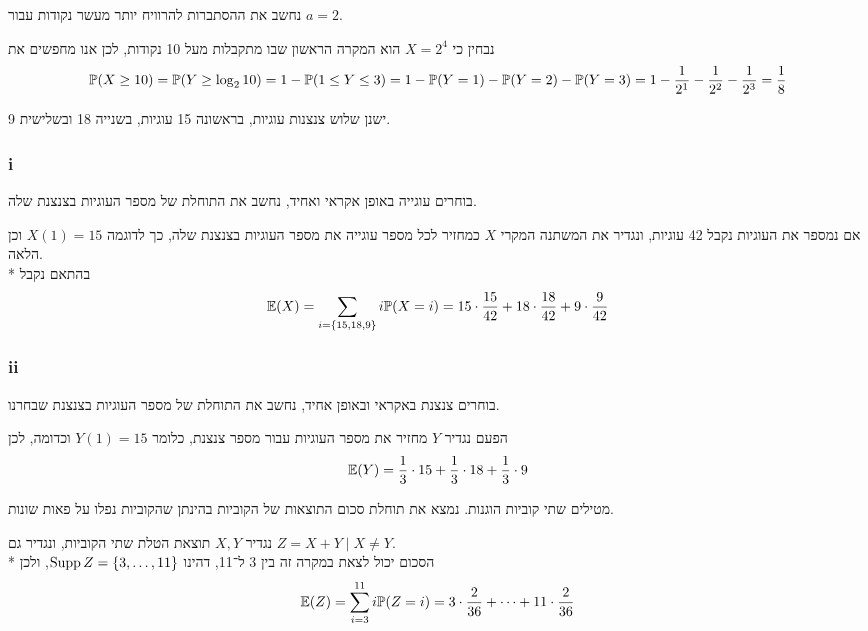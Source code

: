 \subquestion{}
נחשב את ההסתברות להרוויח יותר מעשר נקודות עבור $a = 2$.
\begin{solution}
	נבחין כי $X = 2^4$ הוא המקרה הראשון שבו מתקבלות מעל 10 נקודות, לכן אנו מחפשים את
	\[
		\mathbb{P}(X \ge 10) = \mathbb{P}(Y \ge \log_2 10) = 1 - \mathbb{P}(1 \le Y \le 3) = 1 - \mathbb{P}(Y = 1) - \mathbb{P}(Y = 2) - \mathbb{P}(Y = 3) = 1 - \frac{1}{2^1} - \frac{1}{2^2} - \frac{1}{2^3} = \frac{1}{8}
	\]
\end{solution}

\question{}
\subquestion{}
ישנן שלוש צנצנות עוגיות, בראשונה 15 עוגיות, בשנייה 18 ובשלישית 9.

\subsubsection{i}
בוחרים עוגייה באופן אקראי ואחיד, נחשב את התוחלת של מספר העוגיות בצנצנת שלה.
\begin{solution}
	אם נמספר את העוגיות נקבל 42 עוגיות, ונגדיר את המשתנה המקרי $X$ כמחזיר לכל מספר עוגייה את מספר העוגיות בצנצנת שלה, כך לדוגמה $X(1) = 15$ וכן הלאה. \\*
	בהתאם נקבל
	\[
		\mathbb{E}(X)
		= \sum_{i = \{15, 18, 9\}} i \mathbb{P}(X = i)
		= 15 \cdot \frac{15}{42} + 18 \cdot \frac{18}{42} + 9 \cdot \frac{9}{42}
	\]
\end{solution}

\subsubsection{ii}
בוחרים צנצנת באקראי ובאופן אחיד, נחשב את התוחלת של מספר העוגיות בצנצנת שבחרנו.
\begin{solution}
	הפעם נגדיר $Y$ מחזיר את מספר העוגיות עבור מספר צנצנת, כלומר $Y(1) = 15$ וכדומה, לכן
	\[
		\mathbb{E}(Y) = \frac{1}{3} \cdot 15 + \frac{1}{3} \cdot 18 + \frac{1}{3} \cdot 9
	\]
\end{solution}

\subquestion{}
מטילים שתי קוביות הוגנות.
נמצא את תוחלת סכום התוצאות של הקוביות בהינתן שהקוביות נפלו על פאות שונות.
\begin{solution}
	נגדיר $X, Y$ תוצאת הטלת שתי הקוביות, ונגדיר גם $Z = X + Y \mid X \ne Y$. \\*
	הסכום יכול לצאת במקרה זה בין 3 ל־11, דהינו $\operatorname{Supp} Z = \{3, \dots, 11\}$, ולכן
	\[
		\mathbb{E}(Z)
		= \sum_{i = 3}^{11} i \mathbb{P}(Z = i)
		= 3 \cdot \frac{2}{36} + \cdots + 11 \cdot \frac{2}{36}
	\]
\end{solution}


